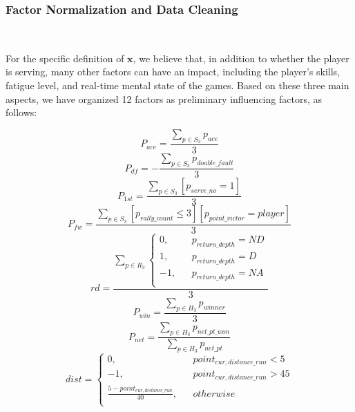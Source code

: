 \subsubsection{Factor Normalization and Data Cleaning}~{}

For the specific definition of $\boldsymbol{x}$, we believe that, 
in addition to whether the player is serving, many other factors can have an impact,
including the player's skills, fatigue level, and real-time mental state of the games.
Based on these three main aspects, 
we have organized 12 factors as preliminary influencing factors, as follows:

\begin{equation}
    P_{ace} = \frac{\sum_{p \in S_3} p_{ace}}{3}
\end{equation}
\begin{equation}
    P_{df} = -\frac{\sum_{p \in S_3} p_{double\_fault}}{3}
\end{equation}
\begin{equation}
    P_{1st} = \frac{\sum_{p \in S_3} [p_{serve\_no} = 1]}{3}
\end{equation}
\begin{equation}
    P_{fw} = \frac{\sum_{p \in S_3} [p_{rally\_count} \le 3] [p_{point\_victor} = player]}{3}
\end{equation}
\begin{equation}
    rd = \frac{\sum_{p \in R_3} \left\{
        \begin{aligned}
        0, && p_{return\_depth} = ND \\
        1, && p_{return\_depth} = D \\
        -1, && p_{return\_depth} = NA \\
        \end{aligned}
        \right.}{3}
\end{equation}
\begin{equation}
    P_{win} = \frac{\sum_{p \in H_3} p_{winner}}{3}
\end{equation}
\begin{equation}
    P_{net} = \frac{\sum_{p \in H_3} p_{net\_pt\_won}}{\sum_{p \in H_3} p_{net\_pt}}
\end{equation}
\begin{equation}
    dist = \left\{
        \begin{aligned}
        0, && point_{cur, distance\_run} < 5 \\
        -1, && point_{cur, distance\_run} > 45 \\
        \frac{5 - point_{cur, distance\_run}}{40}, && otherwise \\
        \end{aligned}
        \right.
\end{equation}

